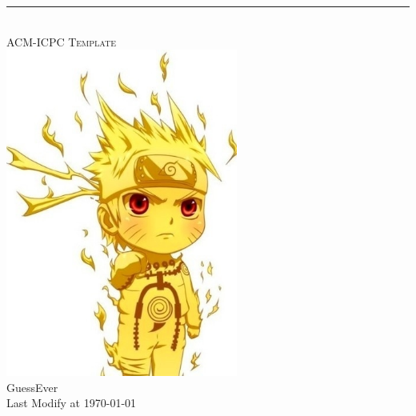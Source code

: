 \begin{center}
	\pagestyle{empty}
	\hrule
	~\\[100pt]
	\fontsize{48pt}{\baselineskip}\selectfont \textsc{ACM-ICPC Template}\\[80pt]
	\includegraphics[width=3in]{./logo.jpg}
	~\\[50pt]
	\Huge GuessEver \\[20pt]
	\Large Last Modify at \today\\
	\clearpage
\end{center}
